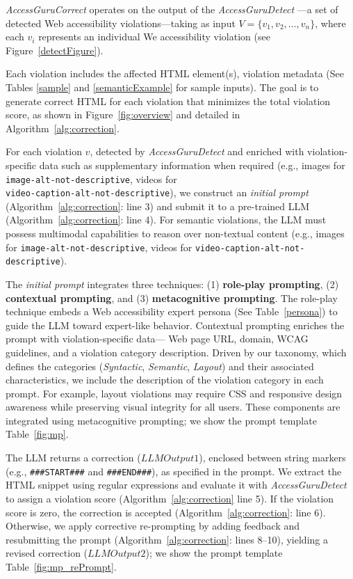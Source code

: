 \documentclass[sigconf, nonacm]{acmart}
\newcommand{\method}{\emph{AccessGuru}}
\begin{document}
\method \emph{Correct} operates on the output of the \method \emph{Detect} —a set of detected Web accessibility violations—taking as input $V = \{v_1, v_2, \ldots, v_n\}$, where each $v_i$ represents an individual We accessibility violation (see Figure~\ref{detectFigure}).

Each violation includes the affected HTML element(s), violation metadata (See Tables \ref{sample} and \ref{semanticExample} for sample inputs). The goal is to generate correct HTML for each violation that minimizes the total violation score, as shown in Figure~\ref{fig:overview} and detailed in Algorithm~\ref{alg:correction}.



For each violation $v$, detected by \method \emph{Detect} and enriched with violation-specific data such as supplementary information when required (e.g., images for \\ \texttt{image-alt-not-descriptive}, videos for \\ \texttt{video-caption-alt-not-descriptive}), we construct an \emph{initial prompt} (Algorithm~\ref{alg:correction}: line 3) and submit it to a pre-trained LLM (Algorithm~\ref{alg:correction}: line 4). For semantic violations, the LLM must possess multimodal capabilities to reason over non-textual content (e.g., images for \texttt{image-alt-not-descriptive}, videos for \texttt{video-caption-alt-not-descriptive}).

The \emph{initial prompt} integrates three techniques: (1) \textbf{role-play prompting}, (2) \textbf{contextual prompting}, and (3) \textbf{metacognitive prompting}. The role-play technique embeds a Web accessibility expert persona (See Table~\ref{persona}) to guide the LLM toward expert-like behavior. Contextual prompting enriches the prompt with violation-specific data— Web page URL, domain, WCAG guidelines, and a violation category description. Driven by our taxonomy, which defines the categories (\emph{Syntactic}, \emph{Semantic}, \emph{Layout}) and their associated characteristics, we include the description of the violation category in each prompt. For example, layout violations may require CSS and responsive design awareness while preserving visual integrity for all users. These components are integrated using metacognitive prompting; we show the prompt template Table~\ref{fig:mp}.

The LLM returns a correction ($LLMOutput1$), enclosed between string markers (e.g., \texttt{\#\#\#START\#\#\#} and \texttt{\#\#\#END\#\#\#}), as specified in the prompt. We extract the HTML snippet using regular expressions and evaluate it with \method \emph{Detect} to assign a violation score (Algorithm~\ref{alg:correction} line 5). If the violation score is zero, the correction is accepted (Algorithm~\ref{alg:correction}: line 6). Otherwise, we apply corrective re-prompting by adding feedback and resubmitting the prompt (Algorithm~\ref{alg:correction}: lines 8–10), yielding a revised correction ($LLMOutput2$); we show the prompt template Table~\ref{fig:mp_rePrompt}.
\end{document}
